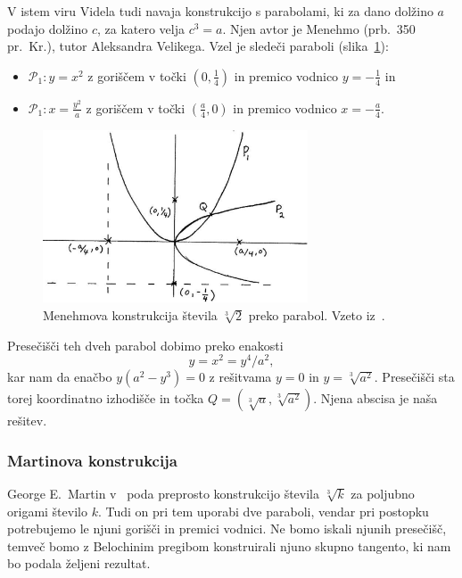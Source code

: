 V istem viru Videla tudi navaja konstrukcijo s parabolami, ki za dano dolžino $a$ podajo dolžino $c$, za katero velja $c^3 = a$. Njen avtor je Menehmo (prb.\ 350 pr.\ Kr.), tutor Aleksandra Velikega. Vzel je sledeči paraboli (slika~\ref{fig:videla}):
\begin{itemize}
    \item $\mathcal{P}_1: y = x^2$ z goriščem v točki $(0, \frac{1}{4})$ in premico vodnico $y = - \frac{1}{4}$ in
    \item $\mathcal{P}_1: x = \frac{y^2}{a}$ z goriščem v točki $(\frac{a}{4}, 0)$ in premico vodnico $x = - \frac{a}{4}$.
\end{itemize}
\begin{figure}[h]
    \centering
    \includegraphics[width=0.7\textwidth]{images/starogr_problemi/cube_parabola.png}
    \caption[Menehmova konstrukcija kubičnega korena]{Menehmova konstrukcija števila $\sqrt[3]{2}$ preko parabol. Vzeto iz~\cite[str.\ 6]{videla1997}.}
    \label{fig:videla}
\end{figure}
Presečišči teh dveh parabol dobimo preko enakosti
$$y = x^2 = y^4/a^2,$$
kar nam da enačbo $y(a^2-y^3) = 0$ z rešitvama $y=0$ in $y = \sqrt[3]{a^2}$. Presečišči sta torej koordinatno izhodišče in točka $Q = (\sqrt[3]{a}, \sqrt[3]{a^2}) $. Njena abscisa je naša rešitev.

\subsubsection*{Martinova konstrukcija}

George E.\ Martin v~\cite[str.\ 156--157]{geometricconstructions} poda preprosto konstrukcijo števila $\sqrt[3]{k}$ za poljubno origami število $k$. Tudi on pri tem uporabi dve paraboli, vendar pri postopku potrebujemo le njuni gorišči in premici vodnici. Ne bomo iskali njunih presečišč, temveč bomo z Belochinim pregibom konstruirali njuno skupno tangento, ki nam bo podala željeni rezultat.

